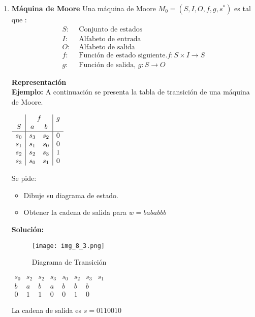 \begin{enumerate}
\item \textbf{Máquina de Moore}
	Una máquina de Moore $M_0=(S,I,O,f,g,s^*)$ es tal que :
\begin{align*}
	S:	&\mbox{ Conjunto de estados}	\\
	I:	&\mbox{ Alfabeto de entrada}	\\
	O:	&\mbox{ Alfabeto de salida}	\\
	f:	&\mbox{ Función de estado siguiente.} f:S\times I\rightarrow S	\\
	g:	&\mbox{ Función de salida, } g:S\rightarrow O	
\end{align*}

\textbf{Representación }\\
\textbf{Ejemplo: }A continuación se presenta la tabla de transición de una máquina de Moore.

\begin{center}
$\begin{array}{c|cc|c}
	&\multicolumn{2}{c|}{f}	&g	\\
S	&a	&b	& 	\\ \hline
s_0	&s_3	&s_2	&0	\\
s_1	&s_1	&s_0	&0	\\
s_2	&s_2	&s_3	&1	\\
s_3	&s_0	&s_1	&0
\end{array}$
\end{center}

Se pide:
\begin{itemize}
\item Dibuje su diagrama de estado.
\item Obtener la cadena de salida para $w=bababbb$
\end{itemize}
\textbf{Solución: }

\begin{figure}[h!]
\centering
\texttt{[image: img\_8\_3.png]}
\caption{Diagrama de Transición}\label{img_8_3}
\end{figure}

\begin{center}
$\begin{array}{c|c|c|c|c|c|c|c}
s_0	&s_2&s_2&s_3&s_0&s_2&s_3&s_1	\\ \hline
b	&a	&b	&a	&b	&b	&b	&		\\ \hline
0	&1	&1	&0	&0	&1	&0	&
\end{array}$
\end{center}

La cadena de salida es $s=0110010$


\end{enumerate}
